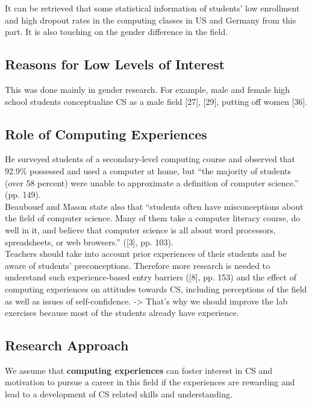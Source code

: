 \documentclass[]{article}
\begin{document}
It can be retrieved that some statistical information of students' low enrollment and high dropout rates in the computing classes in US and Germany from this part. It is also touching on the gender difference in the field.

\subsection{Reasons for Low Levels of Interest}

This was done mainly in gender research.
For example, male and female high school students conceptualize
CS as a male field [27], [29], putting off women [36].
\subsection{Role of Computing Experiences}

He surveyed students of a
secondary-level computing course and observed that 92.9\% possessed
and used a computer at home, but “the majority of students
(over 58 percent) were unable to approximate a definition of
computer science.” (pp. 149).\\
Beaubouef and Mason state also that “students
often have misconceptions about the field of computer science.
Many of them take a computer literacy course, do well in it, and
believe that computer science is all about word processors,
spreadsheets, or web browsers.” ([3], pp. 103).\\

Teachers should take into account prior experiences of their
students and be aware of students' preconceptions. Therefore
more research is needed to understand such experience-based
entry barriers ([8], pp. 153) and the effect of computing experiences
on attitudes towards CS, including perceptions of the field
as well as issues of self-confidence. -> That's why we should improve the lab exercises because most of the students already have experience.
\subsection{Research Approach}
We assume that\textbf{ computing experiences }can foster interest in CS
and motivation to pursue a career in this field if the experiences
are rewarding and lead to a development of CS related skills and
understanding.
\end{document}
